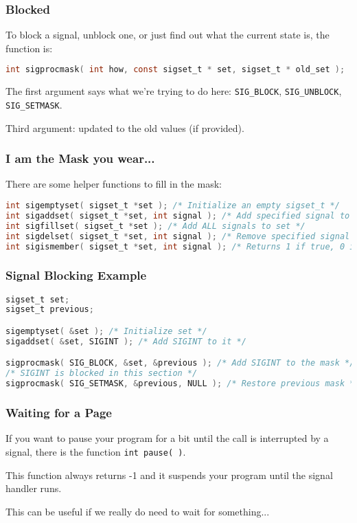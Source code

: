 \begin{frame}[fragile]
	\frametitle{Blocked}

	To block a signal, unblock one, or just find out what the current state is, the function is:
	\begin{lstlisting}[language=C]
int sigprocmask( int how, const sigset_t * set, sigset_t * old_set );
\end{lstlisting}

	The first argument says what we're trying to do here: \texttt{SIG\_BLOCK}, \texttt{SIG\_UNBLOCK}, \texttt{SIG\_SETMASK}.

	Third argument: updated to the old values (if provided).

\end{frame}


\begin{frame}[fragile]
	\frametitle{I am the Mask you wear...}

	There are some helper functions to fill in the mask:
	\begin{lstlisting}[language=C]
int sigemptyset( sigset_t *set ); /* Initialize an empty sigset_t */
int sigaddset( sigset_t *set, int signal ); /* Add specified signal to set */
int sigfillset( sigset_t *set ); /* Add ALL signals to set */
int sigdelset( sigset_t *set, int signal ); /* Remove specified signal from set */
int sigismember( sigset_t *set, int signal ); /* Returns 1 if true, 0 if false */
\end{lstlisting}

\end{frame}


\begin{frame}[fragile]
	\frametitle{Signal Blocking Example}

	\begin{lstlisting}[language=C]
sigset_t set;
sigset_t previous;

sigemptyset( &set ); /* Initialize set */
sigaddset( &set, SIGINT ); /* Add SIGINT to it */

sigprocmask( SIG_BLOCK, &set, &previous ); /* Add SIGINT to the mask */
/* SIGINT is blocked in this section */
sigprocmask( SIG_SETMASK, &previous, NULL ); /* Restore previous mask */

\end{lstlisting}

\end{frame}


\begin{frame}
	\frametitle{Waiting for a Page}

	If you want to pause your program for a bit until the call is interrupted by a signal, there is the function \texttt{int pause( )}.

	This function always returns -1 and it suspends your program until the signal handler runs.

	This can be useful if we really do need to wait for something...

\end{frame}


